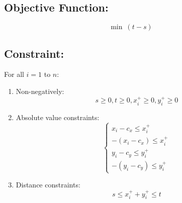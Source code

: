 \documentclass{article}
\begin{document}
\subsection*{Objective Function: }
\[ \min \ (t - s) \]

\subsection*{Constraint: }
For all $i = 1$ to $n$:
\begin{enumerate}
    \item Non-negatively:
    \[ s \geq 0, t \geq 0, x_i^+ \geq 0, y_i^+ \geq 0 \]
    \item Absolute value constraints:
    \[
        \begin{cases}
            x_i - c_x \leq x_i^+ \\
            -(x_i - c_x) \leq x_i^+ \\
            y_i - c_y \leq y_i^+ \\
            -(y_i - c_y) \leq y_i^+
        \end{cases}
    \]
    \item Distance constraints:
    \[ s \leq x_i^+ + y_i^+ \leq t \]
\end{enumerate}
\end{document}
